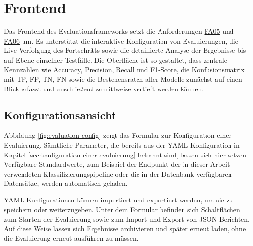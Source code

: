 \section{Frontend}\label{sec:visualisierung-im-frontend}

Das Frontend des Evaluationsframeworks setzt die Anforderungen \hyperlink{FA05}{FA05} und \hyperlink{FA06}{FA06} um. Es unterstützt die interaktive Konfiguration von Evaluierungen, die Live-Verfolgung des Fortschritts sowie die detaillierte Analyse der Ergebnisse bis auf Ebene einzelner Testfälle. Die Oberfläche ist so gestaltet, dass zentrale Kennzahlen wie Accuracy, Precision, Recall und F1-Score, die Konfusionsmatrix mit \ac{TP}, \ac{FP}, \ac{TN}, \ac{FN} sowie die Bestehensraten aller Modelle zunächst auf einen Blick erfasst und anschließend schrittweise vertieft werden können.

\subsection*{Konfigurationsansicht}

Abbildung \ref{fig:evaluation-config} zeigt das Formular zur Konfiguration einer Evaluierung. Sämtliche Parameter, die bereits aus der YAML-Konfiguration in Kapitel \ref{sec:konfiguration-einer-evaluierung} bekannt sind, lassen sich hier setzen. Verfügbare Standardwerte, zum Beispiel der Endpunkt der in dieser Arbeit verwendeten Klassifizierungspipeline oder die in der Datenbank verfügbaren Datensätze, werden automatisch geladen.

YAML-Konfigurationen können importiert und exportiert werden, um sie zu speichern oder weiterzugeben. Unter dem Formular befinden sich Schaltflächen zum Starten der Evaluierung sowie zum Import und Export von JSON-Berichten. Auf diese Weise lassen sich Ergebnisse archivieren und später erneut laden, ohne die Evaluierung erneut ausführen zu müssen.

